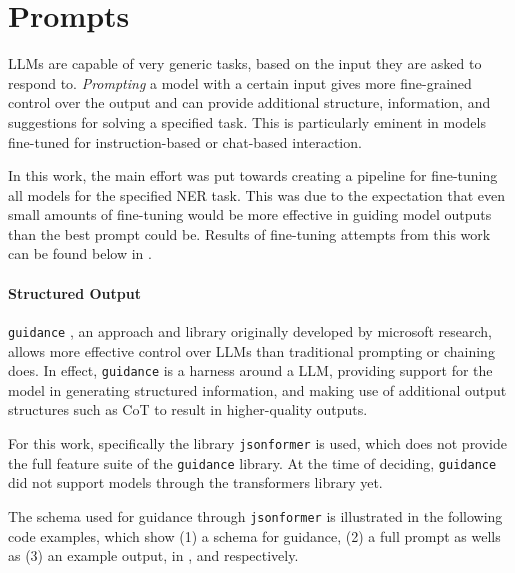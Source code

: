


\section{Prompts}\label{sec:prompts}
\glspl{LLM} are capable of very generic tasks, based on the input they are asked to respond to.
\textit{Prompting} a model with a certain input gives more fine-grained control over the output and can provide additional structure, information, and suggestions for solving a specified task.
This is particularly eminent in models fine-tuned for instruction-based or chat-based interaction.

In this work, the main effort was put towards creating a pipeline for fine-tuning all models for the specified \gls{NER} task.
This was due to the expectation that even small amounts of fine-tuning would be more effective in guiding model outputs than the best prompt could be.
Results of fine-tuning attempts from this work can be found below in .

\paragraph{Structured Output}
\texttt{guidance} \cite{guidance_2023}, an approach and library originally developed by \gls{microsoft} research, allows more effective control over \glspl{LLM} than traditional prompting or chaining does.
In effect, \texttt{guidance} is a harness around a \gls{LLM}, providing support for the model in generating structured information, and making use of additional output structures such as CoT \cite{wei_chainofthought_2022} to result in higher-quality outputs.

For this work, specifically the library \texttt{jsonformer} \cite{1rgs_2023} is used, which does not provide the full feature suite of the \texttt{guidance} library.
At the time of deciding, \texttt{guidance} did not support models through the \gls{transformers} library yet.

The schema used for guidance through \texttt{jsonformer} is illustrated in the following code examples, which show (1) a schema for guidance, (2) a full prompt as wells as (3) an example output, in ,  and  respectively.



